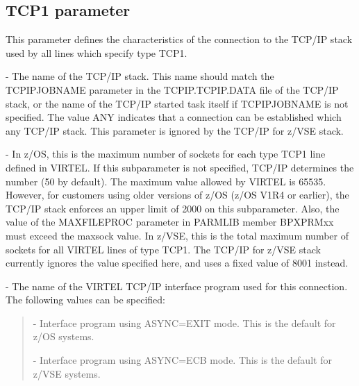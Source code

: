 \documentclass[letterpaper,10pt,english]{sphinxmanual}
\begin{document}

\subsection{TCP1 parameter}
\label{\detokenize{Installation_Guide:tcp1-parameter}}\label{\detokenize{Installation_Guide:index-122}}
\begin{sphinxVerbatim}[commandchars=\\\{\}]
   
\PYG{p}{[}\PYG{p}{]}\PYG{p}{[}\PYG{p}{]}\PYG{p}{[}\PYG{p}{]}\PYG{p}{[}\PYG{p}{]}
\end{sphinxVerbatim}

This parameter defines the characteristics of the connection to the TCP/IP stack used by all lines which specify type TCP1.

 - The name of the TCP/IP stack. This name should match the TCPIPJOBNAME parameter in the TCPIP.TCPIP.DATA file of the TCP/IP stack, or the name of the TCP/IP started task itself if TCPIPJOBNAME is not specified. The value ANY indicates that a connection can be established which any TCP/IP stack. This parameter is ignored by the TCP/IP for z/VSE stack.

 - In z/OS, this is the maximum number of sockets for each type TCP1 line defined in VIRTEL. If this subparameter is not specified, TCP/IP determines the number (50 by default). The maximum value allowed by VIRTEL is 65535. However, for customers using older versions of z/OS (z/OS V1R4 or earlier), the TCP/IP stack enforces an upper limit of 2000 on this subparameter. Also, the value of the MAXFILEPROC parameter in PARMLIB member BPXPRMxx must exceed the maxsock value. In z/VSE, this is the total maximum number of sockets for all VIRTEL lines of type TCP1. The TCP/IP for z/VSE stack currently ignores the value specified here, and uses a fixed value of 8001 instead.

 - The name of the VIRTEL TCP/IP interface program used for this connection. The following values can be specified:
\begin{quote}

 - Interface program using ASYNC=EXIT mode. This is the default for z/OS systems.

 - Interface program using ASYNC=ECB mode. This is the default for z/VSE systems.
\end{quote}
\end{document}
